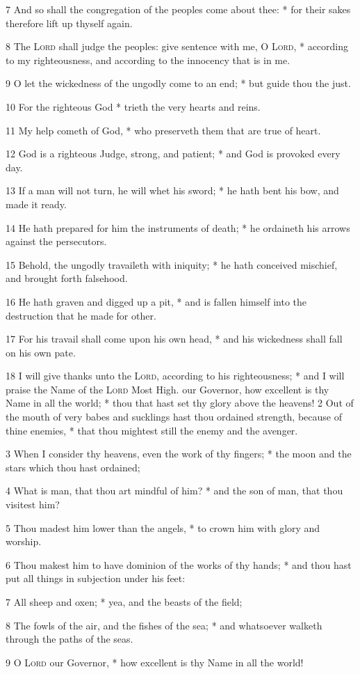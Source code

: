 7 And so shall the congregation of the peoples come about thee: * for their sakes therefore lift up thyself again.\par
8 The {\textsc{Lord}} shall judge the peoples: give sentence with me, O {\textsc{Lord}}, * according to my righteousness, and according to the innocency that is in me.\par
9 O let the wickedness of the ungodly come to an end; * but guide thou the just.\par
10 For the righteous God * trieth the very hearts and reins.\par
11 My help cometh of God, * who preserveth them that are true of heart.\par
12 God is a righteous Judge, strong, and patient; * and God is provoked every day.\par
13 If a man will not turn, he will whet his sword; * he hath bent his bow, and made it ready.\par
14 He hath prepared for him the instruments of death; * he ordaineth his arrows against the persecutors.\par
15 Behold, the ungodly travaileth with iniquity; * he hath conceived mischief, and brought forth falsehood.\par
16 He hath graven and digged up a pit, * and is fallen himself into the destruction that he made for other.\par
17 For his travail shall come upon his own head, * and his wickedness shall fall on his own pate.\par
18 I will give thanks unto the {\textsc{Lord}}, according to his righteousness; * and I will praise the Name of the {\textsc{Lord}} Most High.
 our Governor, how excellent is thy Name in all the world; * thou that hast set thy glory above the heavens!
2 Out of the mouth of very babes and sucklings hast thou ordained strength, because of thine enemies, * that thou mightest still the enemy and the avenger.\par
3 When I consider thy heavens, even the work of thy fingers; * the moon and the stars which thou hast ordained;\par
4 What is man, that thou art mindful of him? * and the son of man, that thou visitest him?\par
5 Thou madest him lower than the angels, * to crown him with glory and worship.\par
6 Thou makest him to have dominion of the works of thy hands; * and thou hast put all things in subjection under his feet:\par
7 All sheep and oxen; * yea, and the beasts of the field;\par
8 The fowls of the air, and the fishes of the sea; * and whatsoever walketh through the paths of the seas.\par
9 O {\textsc{Lord}} our Governor, * how excellent is thy Name in all the world!
